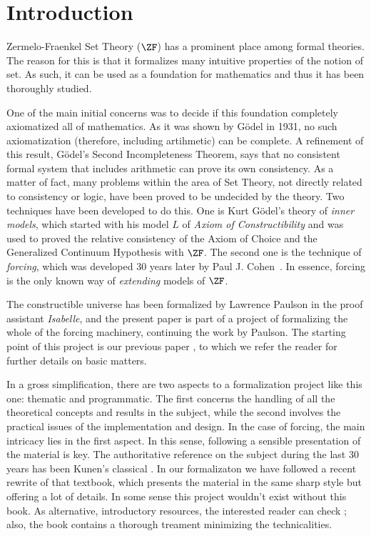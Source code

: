 \section{Introduction}
Zermelo-Fraenkel Set Theory ($\ZF$) has a prominent place among formal
theories. The reason for this is that it formalizes many intuitive
properties of the notion of set. As such, it can be used as a
foundation for mathematics and thus it has been
thoroughly studied. 

One of the main initial concerns was to decide if this foundation
completely axiomatized all of mathematics. As it was shown by G\"odel
in 1931, no  such axiomatization (therefore, including artihmetic) can
be complete. A refinement of this result, G\"odel's Second
Incompleteness Theorem, says that no consistent formal system that
includes arithmetic can prove its own consistency. As a matter of
fact, many problems within the area of Set Theory, not directly related
to consistency or logic, have been proved to be undecided by the
theory. Two techniques have been developed to do this. One is Kurt G\"odel's
theory of \emph{inner models}, which started with his model $L$ of
\emph{Axiom of Constructibility} \cite{godel-L} and was used to proved the relative
consistency of the Axiom of Choice and the Generalized Continuum
Hypothesis with $\ZF$. The second one is the technique of
\emph{forcing}, which was developed 30 years later by Paul
J. Cohen~\cite{Cohen-CH-PNAS}. In essence, forcing is the only known
way of \emph{extending} models of $\ZF$. 

The constructible universe  has been formalized by Lawrence
Paulson \cite{paulson_2003} in the proof assistant \emph{Isabelle}, and
the present paper is part of a project of formalizing the whole of the
forcing machinery, continuing the work by Paulson. The starting point
of this project is our previous paper 
\cite{2018arXiv180705174G}, to which we 
refer the reader for further details on basic matters. 


In a gross simplification, there are two aspects to a formalization
project like this one: thematic and programmatic. The first concerns
the handling of all the theoretical concepts and results in the
subject, while the second involves the practical issues of the
implementation and design. In the case of forcing, the main intricacy
lies in the first aspect. In this sense, following a sensible
presentation of the material is key.  The authoritative reference 
on the subject during the last 30 years has been Kunen's classical
\cite{kunen1980}. In our
formalizaton we have followed a recent rewrite \cite{kunen2011set}
of that  textbook, which presents the material in the same sharp 
style but offering a lot of details. In some sense this project
wouldn't exist without this book. As alternative, introductory
resources, the  interested reader can check
\cite{chow-beginner-forcing}; also, the book \cite{weaver2014forcing}
contains a thorough treament minimizing the technicalities.

